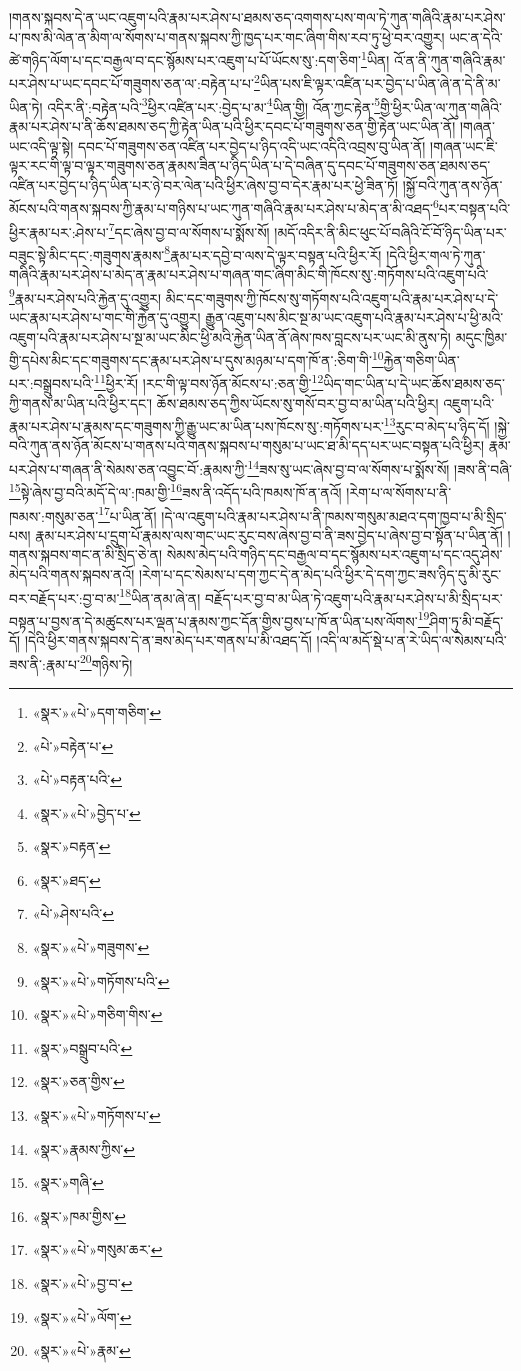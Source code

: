 །གནས་སྐབས་དེ་ན་ཡང་འཇུག་པའི་རྣམ་པར་ཤེས་པ་ཐམས་ཅད་འགགས་པས་གལ་ཏེ་ཀུན་གཞིའི་རྣམ་པར་ཤེས་པ་ཁས་མི་ལེན་ན་མིག་ལ་སོགས་པ་གནས་སྐབས་ཀྱི་ཁྱད་པར་གང་ཞིག་གིས་རབ་ཏུ་ཕྱེ་བར་འགྱུར། ཡང་ན་དེའི་ཚེ་གཉིད་ལོག་པ་དང་བརྒྱལ་བ་དང་སྙོམས་པར་འཇུག་པ་པོ་ཡོངས་སུ་:དག་ཅིག་\footnote{«སྣར་»«པེ་»དག་གཅིག་}ཡིན། འོ་ན་ནི་ཀུན་གཞིའི་རྣམ་པར་ཤེས་པ་ཡང་དབང་པོ་གཟུགས་ཅན་ལ་:བརྟེན་པ་པ་\footnote{«པེ་»བརྟེན་པ་}ཡིན་པས་ཇི་ལྟར་འཛིན་པར་བྱེད་པ་ཡིན་ཞེ་ན་དེ་ནི་མ་ཡིན་ཏེ། འདིར་ནི་:བརྟེན་པའི་\footnote{«པེ་»བརྟན་པའི་}ཕྱིར་འཛིན་པར་:བྱེད་པ་མ་\footnote{«སྣར་»«པེ་»བྱེད་པ་}ཡིན་གྱི། འོན་ཀྱང་རྟེན་\footnote{«སྣར་»བརྟན་}གྱི་ཕྱིར་ཡིན་ལ་ཀུན་གཞིའི་རྣམ་པར་ཤེས་པ་ནི་ཆོས་ཐམས་ཅད་ཀྱི་རྟེན་ཡིན་པའི་ཕྱིར་དབང་པོ་གཟུགས་ཅན་གྱི་རྟེན་ཡང་ཡིན་ནོ། །གཞན་ཡང་འདི་ལྟ་སྟེ། དབང་པོ་གཟུགས་ཅན་འཛིན་པར་བྱེད་པ་ཉིད་འདི་ཡང་འདིའི་འབྲས་བུ་ཡིན་ནོ། །གཞན་ཡང་ཇི་ལྟར་རང་གི་ལྟ་བ་ལྟར་གཟུགས་ཅན་རྣམས་ཟིན་པ་ཉིད་ཡིན་པ་དེ་བཞིན་དུ་དབང་པོ་གཟུགས་ཅན་ཐམས་ཅད་འཛིན་པར་བྱེད་པ་ཉིད་ཡིན་པར་ཉེ་བར་ལེན་པའི་ཕྱིར་ཞེས་བྱ་བ་དེར་རྣམ་པར་ཕྱེ་ཟིན་ཏོ། །སྐྱོ་བའི་ཀུན་ནས་ཉོན་མོངས་པའི་གནས་སྐབས་ཀྱི་རྣམ་པ་གཉིས་པ་ཡང་ཀུན་གཞིའི་རྣམ་པར་ཤེས་པ་མེད་ན་མི་འཐད་\footnote{«སྣར་»ཐད་}པར་བསྟན་པའི་ཕྱིར་རྣམ་པར་:ཤེས་པ་\footnote{«པེ་»ཤེས་པའི་}དང་ཞེས་བྱ་བ་ལ་སོགས་པ་སྨོས་སོ། །མདོ་འདིར་ནི་མིང་ཕུང་པོ་བཞིའི་ངོ་བོ་ཉིད་ཡིན་པར་བཟུང་སྟེ་མིང་དང་:གཟུགས་རྣམས་\footnote{«སྣར་»«པེ་»གཟུགས་}རྣམ་པར་དབྱེ་བ་ལས་དེ་ལྟར་བསྟན་པའི་ཕྱིར་རོ། །དེའི་ཕྱིར་གལ་ཏེ་ཀུན་གཞིའི་རྣམ་པར་ཤེས་པ་མེད་ན་རྣམ་པར་ཤེས་པ་གཞན་གང་ཞིག་མིང་གི་ཁོངས་སུ་:གཏོགས་པའི་འཇུག་པའི་\footnote{«སྣར་»«པེ་»གཏོགས་པའི་}རྣམ་པར་ཤེས་པའི་རྐྱེན་དུ་འགྱུར། མིང་དང་གཟུགས་ཀྱི་ཁོངས་སུ་གཏོགས་པའི་འཇུག་པའི་རྣམ་པར་ཤེས་པ་དེ་ཡང་རྣམ་པར་ཤེས་པ་གང་གི་རྐྱེན་དུ་འགྱུར། རྒྱུན་འཇུག་པས་མིང་སྔ་མ་ཡང་འཇུག་པའི་རྣམ་པར་ཤེས་པ་ཕྱི་མའི་འཇུག་པའི་རྣམ་པར་ཤེས་པ་སྔ་མ་ཡང་མིང་ཕྱི་མའི་རྐྱེན་ཡིན་ནོ་ཞེས་ཁས་བླངས་པར་ཡང་མི་ནུས་ཏེ། མདུང་ཁྱིམ་གྱི་དཔེས་མིང་དང་གཟུགས་དང་རྣམ་པར་ཤེས་པ་དུས་མཉམ་པ་དག་ཁོ་ན་:ཅིག་གི་\footnote{«སྣར་»«པེ་»གཅིག་གིས་}རྐྱེན་གཅིག་ཡིན་པར་:བསྒྲུབས་པའི་\footnote{«སྣར་»བསྒྲུབ་པའི་}ཕྱིར་རོ། །རང་གི་ལྟ་བས་ཉོན་མོངས་པ་:ཅན་གྱི་\footnote{«སྣར་»ཅན་གྱིས་}ཡིད་གང་ཡིན་པ་དེ་ཡང་ཆོས་ཐམས་ཅད་ཀྱི་གནས་མ་ཡིན་པའི་ཕྱིར་དང་། ཆོས་ཐམས་ཅད་ཀྱིས་ཡོངས་སུ་གསོ་བར་བྱ་བ་མ་ཡིན་པའི་ཕྱིར། འཇུག་པའི་རྣམ་པར་ཤེས་པ་རྣམས་དང་གཟུགས་ཀྱི་རྒྱུ་ཡང་མ་ཡིན་པས་ཁོངས་སུ་:གཏོགས་པར་\footnote{«སྣར་»«པེ་»གཏོགས་པ་}རུང་བ་མེད་པ་ཉིད་དོ། །སྐྱེ་བའི་ཀུན་ནས་ཉོན་མོངས་པ་གནས་པའི་གནས་སྐབས་པ་གསུམ་པ་ཡང་ཐ་མི་དད་པར་ཡང་བསྟན་པའི་ཕྱིར། རྣམ་པར་ཤེས་པ་གཞན་ནི་སེམས་ཅན་འབྱུང་བོ་:རྣམས་ཀྱི་\footnote{«སྣར་»རྣམས་ཀྱིས་}ཟས་སུ་ཡང་ཞེས་བྱ་བ་ལ་སོགས་པ་སྨོས་སོ། །ཟས་ནི་བཞི་\footnote{«སྣར་»གཞི་}སྟེ་ཞེས་བྱ་བའི་མདོ་དེ་ལ་:ཁམ་གྱི་\footnote{«སྣར་»ཁམ་གྱིས་}ཟས་ནི་འདོད་པའི་ཁམས་ཁོ་ན་ནའོ། །རེག་པ་ལ་སོགས་པ་ནི་ཁམས་:གསུམ་ཅན་\footnote{«སྣར་»«པེ་»གསུམ་ཆར་}པ་ཡིན་ནོ། །དེ་ལ་འཇུག་པའི་རྣམ་པར་ཤེས་པ་ནི་ཁམས་གསུམ་མཐའ་དག་ཁྱབ་པ་མི་སྲིད་པས། རྣམ་པར་ཤེས་པ་དྲུག་པོ་རྣམས་ལས་གང་ཡང་རུང་བས་ཞེས་བྱ་བ་ནི་ཟས་བྱེད་པ་ཞེས་བྱ་བ་སྟོན་པ་ཡིན་ནོ། །གནས་སྐབས་གང་ན་མི་སྲིད་ཅེ་ན། སེམས་མེད་པའི་གཉིད་དང་བརྒྱལ་བ་དང་སྙོམས་པར་འཇུག་པ་དང་འདུ་ཤེས་མེད་པའི་གནས་སྐབས་ནའོ། །རེག་པ་དང་སེམས་པ་དག་ཀྱང་དེ་ན་མེད་པའི་ཕྱིར་དེ་དག་ཀྱང་ཟས་ཉིད་དུ་མི་རུང་བར་བརྗོད་པར་:བྱ་བ་མ་\footnote{«སྣར་»«པེ་»བྱ་བ་}ཡིན་ནམ་ཞེ་ན། བརྗོད་པར་བྱ་བ་མ་ཡིན་ཏེ་འཇུག་པའི་རྣམ་པར་ཤེས་པ་མི་སྲིད་པར་བསྟན་པ་བྱས་ན་དེ་མཚུངས་པར་ལྡན་པ་རྣམས་ཀྱང་དོན་གྱིས་བྱས་པ་ཁོ་ན་ཡིན་པས་ལོགས་\footnote{«སྣར་»«པེ་»ལོག་}ཤིག་ཏུ་མི་བརྗོད་དོ། །དེའི་ཕྱིར་གནས་སྐབས་དེ་ན་ཟས་མེད་པར་གནས་པ་མི་འཐད་དོ། །འདི་ལ་མདོ་སྡེ་པ་ན་རེ་ཡིད་ལ་སེམས་པའི་ཟས་ནི་:རྣམ་པ་\footnote{«སྣར་»«པེ་»རྣམ་}གཉིས་ཏེ། 